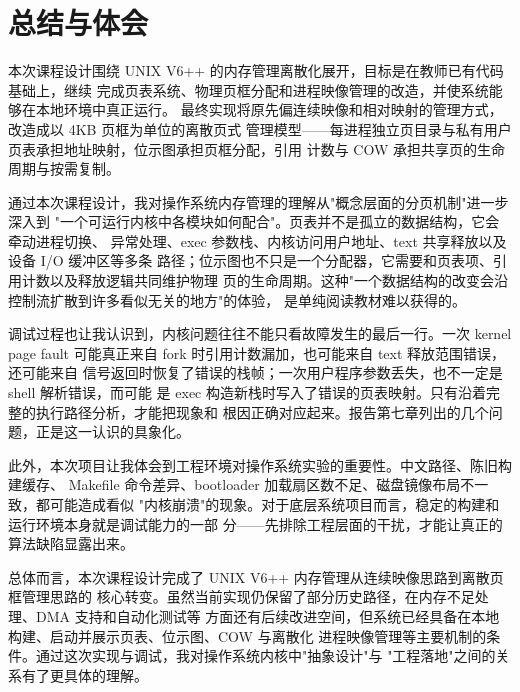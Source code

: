 \chapter{总结与体会}

本次课程设计围绕 UNIX V6++ 的内存管理离散化展开，目标是在教师已有代码基础上，继续
完成页表系统、物理页框分配和进程映像管理的改造，并使系统能够在本地环境中真正运行。
最终实现将原先偏连续映像和相对映射的管理方式，改造成以 4KB 页框为单位的离散页式
管理模型——每进程独立页目录与私有用户页表承担地址映射，位示图承担页框分配，引用
计数与 COW 承担共享页的生命周期与按需复制。

通过本次课程设计，我对操作系统内存管理的理解从"概念层面的分页机制"进一步深入到
"一个可运行内核中各模块如何配合"。页表并不是孤立的数据结构，它会牵动进程切换、
异常处理、exec 参数栈、内核访问用户地址、text 共享释放以及设备 I/O 缓冲区等多条
路径；位示图也不只是一个分配器，它需要和页表项、引用计数以及释放逻辑共同维护物理
页的生命周期。这种"一个数据结构的改变会沿控制流扩散到许多看似无关的地方"的体验，
是单纯阅读教材难以获得的。

调试过程也让我认识到，内核问题往往不能只看故障发生的最后一行。一次 kernel page
fault 可能真正来自 fork 时引用计数漏加，也可能来自 text 释放范围错误，还可能来自
信号返回时恢复了错误的栈帧；一次用户程序参数丢失，也不一定是 shell 解析错误，而可能
是 exec 构造新栈时写入了错误的页表映射。只有沿着完整的执行路径分析，才能把现象和
根因正确对应起来。报告第七章列出的几个问题，正是这一认识的具象化。

此外，本次项目让我体会到工程环境对操作系统实验的重要性。中文路径、陈旧构建缓存、
Makefile 命令差异、bootloader 加载扇区数不足、磁盘镜像布局不一致，都可能造成看似
"内核崩溃"的现象。对于底层系统项目而言，稳定的构建和运行环境本身就是调试能力的一部
分——先排除工程层面的干扰，才能让真正的算法缺陷显露出来。

总体而言，本次课程设计完成了 UNIX V6++ 内存管理从连续映像思路到离散页框管理思路的
核心转变。虽然当前实现仍保留了部分历史路径，在内存不足处理、DMA 支持和自动化测试等
方面还有后续改进空间，但系统已经具备在本地构建、启动并展示页表、位示图、COW 与离散化
进程映像管理等主要机制的条件。通过这次实现与调试，我对操作系统内核中"抽象设计"与
"工程落地"之间的关系有了更具体的理解。

\clearpage
